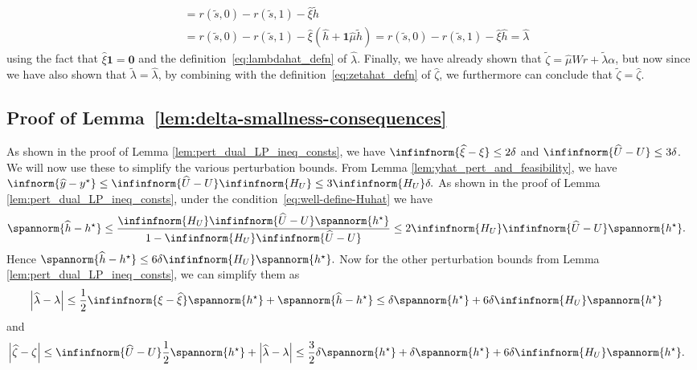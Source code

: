 \documentclass[mnsc,nonblindrev]{informs3}
\newcommand{\one}{\mathbf{1}}
\newcommand{\hhat}{\widehat{h}}
\newcommand{\zero}{\mathbf{0}}
\newcommand{\muhat}{\widehat{\mu}}
\newcommand{\uhat}{\widehat{U}}
\newcommand{\yhat}{\widehat{y}}
\newcommand{\xihat}{\widehat{\xi}}
\newcommand{\zetahat}{\widehat{\zeta}}
\newcommand{\lambdahat}{\widehat{\lambda}}
\begin{document}
\begin{APPENDICES}
\begin{align*}
    &= r(\tilde{s},0)-r(\tilde{s},1) - \xihat \tilde{h} \\
    &= r(\tilde{s},0)-r(\tilde{s},1) - \xihat (\hhat + \one \muhat \tilde{h}) = r(\tilde{s},0)-r(\tilde{s},1) - \xihat \hhat 
    = \lambdahat
\end{align*}
using the fact that $\xihat \one = \zero$ and the definition~\eqref{eq:lambdahat_defn} of $\lambdahat$.
Finally, we have already shown that $\tilde{\zeta} = \muhat W r + \tilde{\lambda} \alpha$, but now since we have also shown that $\tilde{\lambda} = \lambdahat$, by combining with the definition~\eqref{eq:zetahat_defn} of $\zetahat$, we furthermore can conclude that $\tilde{\zeta} = \zetahat$. 
\Halmos
\endproof
\subsection{Proof of Lemma~\ref{lem:delta-smallness-consequences}}\label{subsec:pr-part4}
 As shown in the proof of Lemma \ref{lem:pert_dual_LP_ineq_consts}, we have $\infinfnorm{\xihat - \xi} \leq 2\delta$ and $\infinfnorm{\uhat - U} \leq 3 \delta$. We will now use these to simplify the various perturbation bounds.
From Lemma \ref{lem:yhat_pert_and_feasibility}, we have
$
    \infnorm{\yhat - y^\star} \leq \infinfnorm{\uhat - U} \infinfnorm{H_U} \leq 3 \infinfnorm{H_U}\delta .
$
As shown in the proof of Lemma \ref{lem:pert_dual_LP_ineq_consts}, under the condition~\eqref{eq:well-define-Huhat} we have
\begin{align*}
    \spannorm{\hhat - h^\star} &\leq \frac{\infinfnorm{H_U} \infinfnorm{\uhat - U} \spannorm{h^\star}}{1-\infinfnorm{H_U} \infinfnorm{\uhat-U}}  \leq 2 \infinfnorm{H_U} \infinfnorm{\uhat - U} \spannorm{h^\star}.
\end{align*}
Hence
$
    \spannorm{\hhat - h^\star}  \leq 6 \delta \infinfnorm{H_U} \spannorm{h^\star}.
$
Now for the other perturbation bounds from Lemma \ref{lem:pert_dual_LP_ineq_consts}, we can simplify them as
\begin{align*}
    \left| \lambdahat - \lambda \right| & \leq \frac{1}{2}\infinfnorm{\xi - \xihat} \spannorm{h^\star} + \spannorm{\hhat - h^\star} \leq \delta \spannorm{h^\star} + 6 \delta \infinfnorm{H_U} \spannorm{h^\star}
\end{align*}
and
\begin{align*}
    \left| \zetahat - \zeta \right| 
    & \leq  \infinfnorm{\uhat - U} \frac{1}{2}\spannorm{h^\star} + \left|\lambdahat - \lambda \right| 
    \leq \frac{3}{2}\delta \spannorm{h^\star} + \delta \spannorm{h^\star} + 6 \delta \infinfnorm{H_U} \spannorm{h^\star}. 
\end{align*}


\end{APPENDICES}
\end{document}
